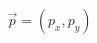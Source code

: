 \documentclass[preview]{standalone}
\begin{document}
\begin{align*}
\vec{p}=(p_x, p_y)
\end{align*}
\end{document}
